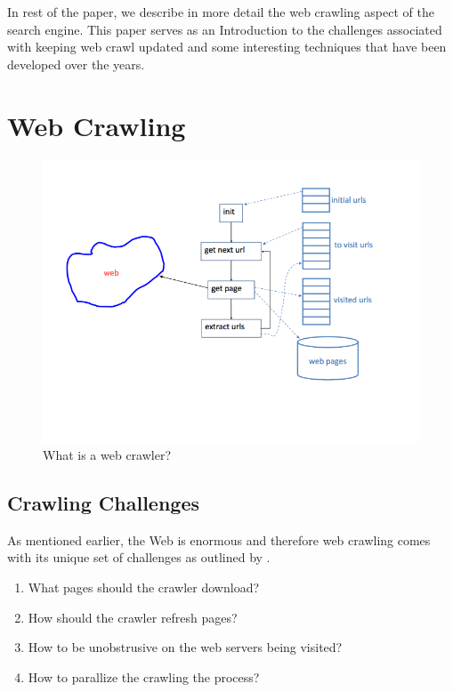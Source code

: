 \documentclass[a4paper, 11pt]{article} %
\begin{document}
In rest of the paper, we describe in more detail the web crawling aspect of the search engine. This paper serves as an Introduction to the challenges associated with keeping web crawl updated and some interesting techniques that have been developed over the years. \\


\section{Web Crawling}

\begin{figure} %
\begin{center}
\includegraphics[width=1\textwidth]{webcrawling.png}
\end{center}
\caption{What is a web crawler?}
\end{figure}

\subsection{Crawling Challenges}

As mentioned earlier, the Web is enormous and therefore web crawling comes with its unique set of challenges as outlined by \cite{arasu2001searching}.

\begin{enumerate}

\item What pages should the crawler download?

\item How should the crawler refresh pages? 

\item How to be unobstrusive on the web servers being visited?

\item How to parallize the crawling the process? 

\end{enumerate}
\end{document}
